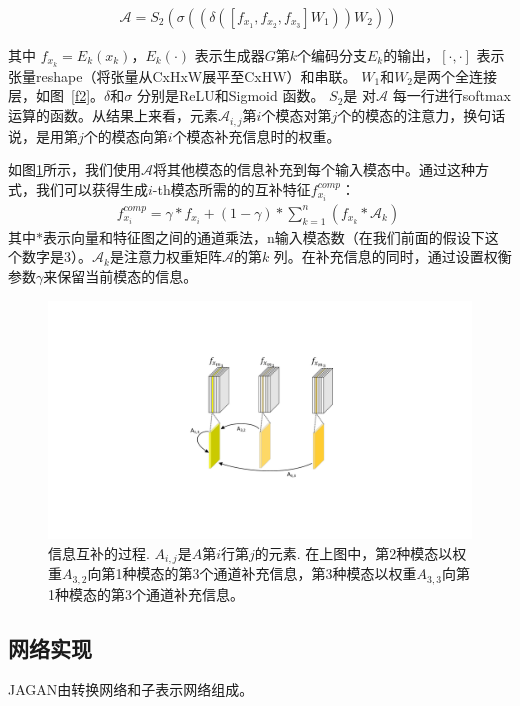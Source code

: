 \begin{align}
	\mathcal{A} = S_2(\sigma((\delta([f_{x_1}, f_{x_2}, f_{x_3}]W_1))W_2))\
	\label{e1}
\end{align}

其中 $f_{x_k}=E_k(x_k)$，$E_k(\cdot)$ 表示生成器$G$第$k$个编码分支$E_k$的输出，$[\cdot,\cdot]$ 表示张量reshape（将张量从CxHxW展平至CxHW）和串联。 $W_1$和$W_2$是两个全连接层，如图~\ref{f2}。$\delta$和$\sigma$ 分别是ReLU\cite{nair2010rectified}和Sigmoid 函数。 $S_2$是 对$\mathcal{A}$ 每一行进行softmax运算的函数。从结果上来看，元素$\mathcal{A}_{i,j}$第$i$个模态对第$j$个的模态的注意力，换句话说，是用第$j$个的模态向第$i$个模态补充信息时的权重。

如图\ref{f3}所示，我们使用$\mathcal{A}$将其他模态的信息补充到每个输入模态中。通过这种方式，我们可以获得生成$i$-th模态所需的的互补特征$f_{x_i}^{comp}$：
\begin{gather}
	f_{x_i}^{comp} = \gamma * f_{x_i} +
	(1-\gamma) * \sum_{k=1}^n (f_{x_k} * \mathcal{A}_{k})\
\end{gather}
其中$*$表示向量和特征图之间的通道乘法，n输入模态数（在我们前面的假设下这个数字是3）。$\mathcal{A}_{k}$是注意力权重矩阵$\mathcal{A}$的第$k$ 列。在补充信息的同时，通过设置权衡参数$\gamma$来保留当前模态的信息。

\begin{figure}
	\centering
	\includegraphics[width=0.8\columnwidth]{figures/JAGAN/20201109InterAttention_function_BV1_0.pdf}
	\caption[aaa]{信息互补的过程. $A_{i,j}$是$A$第$i$行第$j$的元素. 在上图中，第2种模态以权重$A_{3,2}$向第1种模态的第3个通道补充信息，第3种模态以权重$A_{3,3}$向第1种模态的第3个通道补充信息。} 
	\label{f3}
\end{figure}

\subsection{网络实现}

JAGAN由转换网络和子表示网络组成。

